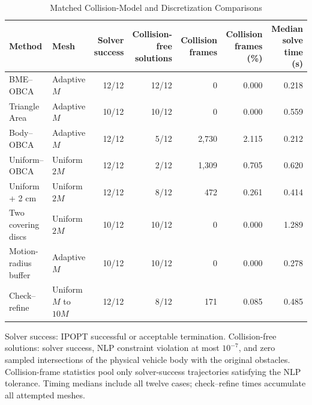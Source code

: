 \begin{table}[t]
\caption{Matched Collision-Model and Discretization Comparisons}\label{tab:comparison}
\centering\footnotesize
\begin{tabular}{@{}llrrrrr@{}}\toprule
Method&Mesh&\shortstack{Solver\\success}&\shortstack{Collision-free\\solutions}&Collision frames&Collision frames (\%)&Median solve time (s)\\\midrule
BME--OBCA&Adaptive $M$&12/12&12/12&0&0.000&0.218\\
Triangle Area&Adaptive $M$&10/12&10/12&0&0.000&0.559\\
Body--OBCA&Adaptive $M$&12/12&5/12&2,730&2.115&0.212\\
Uniform--OBCA&Uniform $2M$&12/12&2/12&1,309&0.705&0.620\\
Uniform + 2 cm&Uniform $2M$&12/12&8/12&472&0.261&0.414\\
Two covering discs&Uniform $2M$&10/12&10/12&0&0.000&1.289\\
Motion-radius buffer&Adaptive $M$&10/12&10/12&0&0.000&0.278\\
Check--refine&Uniform $M$ to $10M$&12/12&8/12&171&0.085&0.485\\
\bottomrule\end{tabular}
\par\smallskip\parbox{\textwidth}{\footnotesize Solver success: IPOPT successful or acceptable termination. Collision-free solutions: solver success, NLP constraint violation at most $10^{-7}$, and zero sampled intersections of the physical vehicle body with the original obstacles. Collision-frame statistics pool only solver-success trajectories satisfying the NLP tolerance. Timing medians include all twelve cases; check--refine times accumulate all attempted meshes.}
\end{table}
